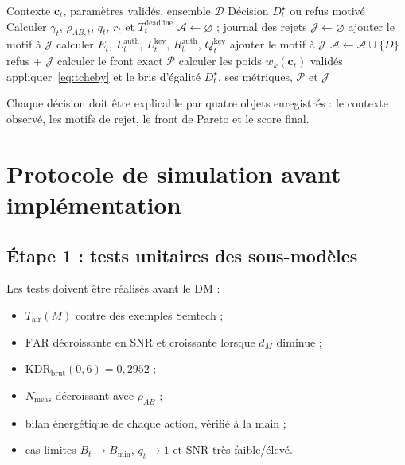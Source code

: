 \documentclass[conference,a4paper]{IEEEtran}
\newcommand{\Rauth}{R^{\mathrm{auth}}}
\newcommand{\Rkey}{Q^{\mathrm{key}}}
\newcommand{\FAR}{\mathrm{FAR}}
\newcommand{\KDR}{\mathrm{KDR}}
\newcommand{\ToA}{T_{\mathrm{air}}}
\begin{document}
\begin{algorithm}[t]
\caption{Decision Maker au temps $t$}
\label{alg:dm}
\begin{algorithmic}[1]
\Require Contexte $\mathbf{c}_t$, paramètres validés, ensemble $\mathcal{D}$
\Ensure Décision $D_t^\star$ ou refus motivé
\State Calculer $\gamma_t$, $\rho_{AB,t}$, $q_t$, $r_t$ et $T_t^{\mathrm{deadline}}$
\State $\mathcal{A}\gets\varnothing$ ; journal des rejets $\mathcal{J}\gets\varnothing$
        \State ajouter le motif à $\mathcal{J}$
    \Else
        \State calculer $E_t$, $L_t^{\mathrm{auth}}$, $L_t^{\mathrm{key}}$, $\Rauth_t$, $\Rkey_t$
            \State ajouter le motif à $\mathcal{J}$
        \Else
            \State $\mathcal{A}\gets\mathcal{A}\cup\{D\}$
        \EndIf
    \EndIf
\EndFor
{}
    \State \Return refus + $\mathcal{J}$
\EndIf
\State calculer le front exact $\mathcal{P}$
\State calculer les poids $w_k(\mathbf{c}_t)$ validés
\State appliquer~\eqref{eq:tcheby} et le bris d'égalité
\State \Return $D_t^\star$, ses métriques, $\mathcal{P}$ et $\mathcal{J}$
\end{algorithmic}
\end{algorithm}

Chaque décision doit être explicable par quatre objets enregistrés : le contexte observé, les motifs de rejet, le front de Pareto et le score final.

\section{Protocole de simulation avant implémentation}

\subsection{Étape 1 : tests unitaires des sous-modèles}
Les tests doivent être réalisés avant le DM :
\begin{itemize}
    \item $\ToA(M)$ contre des exemples Semtech ;
    \item $\FAR$ décroissante en SNR et croissante lorsque $d_M$ diminue ;
    \item $\KDR_{\mathrm{brut}}(0{,}6)=0{,}2952$ ;
    \item $N_{\mathrm{meas}}$ décroissant avec $\rho_{AB}$ ;
    \item bilan énergétique de chaque action, vérifié à la main ;
    \item cas limites $B_t\rightarrow B_{\min}$, $q_t\rightarrow1$ et SNR très faible/élevé.
\end{itemize}
\end{document}
